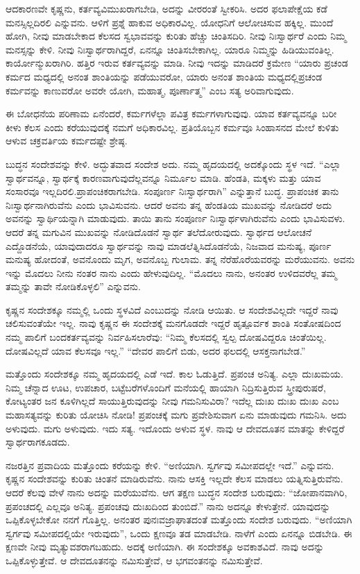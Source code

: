 ಆದಕಾರಣವೇ ಕೃಷ್ಣನು, ಕರ್ತವ್ಯವಿಮುಖರಾಗಬೇಡಿ, ಅದನ್ನು ವೀರರಂತೆ ಸ್ವೀಕರಿಸಿ. ಅದರ ಫಲಾಪೇಕ್ಷೆಯ ಕಡೆ ಮನಸ್ಸಿಲ್ಲದಿರಲಿ ಎನ್ನುವನು. ಆಳಿಗೆ ಪ್ರಶ್ನೆ ಹಾಕುವ ಅಧಿಕಾರವಿಲ್ಲ. ಯೋಧನಿಗೆ ಆಲೋಚಿಸುವ ಹಕ್ಕಿಲ್ಲ. ಮುಂದೆ ಹೋಗಿ, ನೀವು ಮಾಡಬೇಕಾದ ಕೆಲಸದ ಸ್ವಭಾವವನ್ನು ಕುರಿತು ಹೆಚ್ಚು ಚಿಂತಿಸದಿರಿ. ನೀವು ನಿಃಸ್ವಾರ್ಥರೆ ಎಂದು ನಿಮ್ಮ ಮನಸ್ಸನ್ನು ಕೇಳಿ. ನೀವು ನಿಃಸ್ವಾರ್ಥರಾಗಿದ್ದರೆ, ಏನನ್ನೂ ಚಿಂತಿಸಬೇಕಾಗಿಲ್ಲ. ಯಾರೂ ನಿಮ್ಮನ್ನು ಹಿಡಿಯುವಂತಿಲ್ಲ. ಕಾರ್ಯೋನ್ಮುಖರಾಗಿರಿ. ಹತ್ತಿರ ಇರುವ ಕರ್ತವ್ಯವನ್ನು ಮಾಡಿ. ನೀವು ಇದನ್ನು ಮಾಡಿದರೆ ಕ್ರಮೇಣ “ಯಾರು ಪ್ರಚಂಡ ಕರ್ಮದ ಮಧ್ಯದಲ್ಲಿ ಅನಂತ ಶಾಂತಿಯನ್ನು ಪಡೆಯುವರೋ, ಯಾರು ಅನಂತ ಶಾಂತಿಯ ಮಧ್ಯದಲ್ಲಿ\break ಪ್ರಚಂಡ ಕರ್ಮವನ್ನು ಕಾಣುವರೋ ಅವರೇ ಯೋಗಿ, ಮಹಾತ್ಮ, ಪೂರ್ಣಾತ್ಮ” ಎಂಬ ಸತ್ಯ ಅರಿವಾಗುವುದು.

ಈ ಬೋಧನೆಯ ಪರಿಣಾಮ ಏನೆಂದರೆ, ಕರ್ಮಗಳೆಲ್ಲಾ ಪವಿತ್ರ ಕರ್ಮಗಳಾಗುವುವು. ಯಾವ ಕರ್ತವ್ಯವನ್ನೂ ಬರೀ ಕೀಳು ಕೆಲಸ ಎಂದು ಕರೆಯುವುದಕ್ಕೆ ನಮಗೆ ಅಧಿಕಾರವಿಲ್ಲ. ಪ್ರತಿಯೊಬ್ಬನ ಕರ್ಮವೂ ಸಿಂಹಾಸನದ ಮೇಲೆ ಕುಳಿತು ಆಳುವ ಚಕ್ರವರ್ತಿಯ ಕರ್ಮದಷ್ಟೇ ಶ್ರೇಷ್ಠ.

ಬುದ್ಧನ ಸಂದೇಶವನ್ನು ಕೇಳಿ. ಅದ್ಭುತವಾದ ಸಂದೇಶ ಅದು. ನಮ್ಮ ಹೃದಯದಲ್ಲಿ ಅದಕ್ಕೊಂದು ಸ್ಥಳ ಇದೆ. “ಎಲ್ಲಾ ಸ್ವಾರ್ಥವನ್ನೂ, ಸ್ವಾರ್ಥಕ್ಕೆ ಕಾರಣವಾಗುವುದೆಲ್ಲವನ್ನೂ ನಿರ್ಮೂಲ ಮಾಡಿ. ಹೆಂಡತಿ, ಮಕ್ಕಳು ಮತ್ತು ಯಾವ ಸಂಸಾರವೂ ಇಲ್ಲದಿರಲಿ.\break ಪ್ರಾಪಂಚಿಕರಾಗಬೇಡಿ. ಸಂಪೂರ್ಣ ನಿಃಸ್ವಾರ್ಥರಾಗಿ” ಎನ್ನುತ್ತಾನೆ ಬುದ್ಧ. ಪ್ರಾಪಂಚಿಕ ತಾನು ನಿಃಸ್ವಾರ್ಥನಾಗಿರುವೆನು ಎಂದು ಭಾವಿಸುವನು. ಆದರೆ ಅವನು ತನ್ನ ಹೆಂಡತಿಯ ಮುಖವನ್ನು ನೋಡಿದರೆ ಅದು ಅವನನ್ನು ಸ್ವಾರ್ಥಿಯನ್ನಾಗಿ ಮಾಡುವುದು. ತಾಯಿ ತಾನು ಸಂಪೂರ್ಣ ನಿಃಸ್ವಾರ್ಥಳಾಗಿರುವೆನು ಎಂದು ಭಾವಿಸುವಳು. ಆದರೆ ತನ್ನ ಮಗುವಿನ ಮುಖವನ್ನು ನೋಡಿದೊಡನೆ ಸ್ವಾರ್ಥ ತಲೆದೋರುವುದು. ಸ್ವಾರ್ಥದ ಆಲೋಚನೆ ಎದ್ದೊಡನೆಯೆ, ಯಾವುದಾದರೂ ಸ್ವಾರ್ಥವನ್ನು ನಾವು ಮಾಡಲೆತ್ನಿಸಿದೊಡನೆಯೆ, ನಿಜವಾದ ಮನುಷ್ಯ, ಪೂರ್ಣ ಮನುಷ್ಯ ಹೋದಂತೆ, ಅವನೊಂದು ಮೃಗ, ಅವನೊಬ್ಬ ಗುಲಾಮ. ತನ್ನ ನೆರೆಹೊರೆಯವರನ್ನು ಮರೆಯುವನು. ಅವನು ಇನ್ನು ಮೊದಲು ನೀನು ನಂತರ ನಾನು ಎಂದು ಹೇಳುವುದಿಲ್ಲ. “ಮೊದಲು ನಾನು, ಅನಂತರ ಉಳಿದವರೆಲ್ಲ ತಮ್ಮ ತಮ್ಮನ್ನು ತಾವೇ ನೋಡಿಕೊಳ್ಳಲಿ” ಎನ್ನುವನು.

ಕೃಷ್ಣನ ಸಂದೇಶಕ್ಕೂ ನಮ್ಮಲ್ಲಿ ಒಂದು ಸ್ಥಳವಿದೆ ಎಂಬುದನ್ನು ನೋಡಿ ಆಯಿತು. ಆ ಸಂದೇಶವಿಲ್ಲದೇ ಇದ್ದರೆ ನಾವು ಚಲಿಸುವಂತೆಯೇ ಇಲ್ಲ. ನಾವು ಕೃಷ್ಣನ ಈ ಸಂದೇಶಕ್ಕೆ ಮನಗೊಡದೇ ಇದ್ದರೆ ಹೃತ್ಪೂರ್ವಕ ಶಾಂತಿ ಸಂತೋಷದಿಂದ ನಮ್ಮ ಪಾಲಿಗೆ ಬಂದ\break ಕರ್ತವ್ಯವನ್ನು ನಿರ್ವಹಿಸಲಾರೆವು: “ನಿಮ್ಮ ಕೆಲಸದಲ್ಲಿ ಸ್ವಲ್ಪ ದೋಷವಿದ್ದರೂ ಚಿಂತೆಯಿಲ್ಲ. ದೋಷವಿಲ್ಲದೆ ಯಾವ ಕೆಲಸವೂ ಇಲ್ಲ.” “ದೇವರ ಪಾಲಿಗೆ ಬಿಡು, ಅದರ ಫಲದಲ್ಲಿ ಆಸಕ್ತನಾಗಬೇಡ.”

ಮತ್ತೊಂದು ಸಂದೇಶಕ್ಕೂ ನಮ್ಮ ಹೃದಯದಲ್ಲಿ ಎಡೆ ಇದೆ. ಕಾಲ ಓಡುತ್ತಿದೆ. ಪ್ರಪಂಚ ಅನಿತ್ಯ. ಎಲ್ಲಾ ದುಃಖಮಯ. ನಿಮ್ಮ ಚೆನ್ನಾದ ಊಟ, ಉಪಚಾರ, ಬಟ್ಟೆಬರೆಗಳೊಂದಿಗೆ ಮನೆಯಲ್ಲಿ ಹಾಯಾಗಿ ನಿದ್ರಿಸುತ್ತಿರುವ ಸ್ತ್ರೀಪುರುಷರೆ, ಕೋಟ್ಯಂತರ ಜನ ಕೂಳಿಗಿಲ್ಲದೆ ಸಾಯುತ್ತಿರುವುದನ್ನು ನೀವು ಗಮನಿಸುವಿರಾ? ಇದೆಲ್ಲ ದುಃಖ ದುಃಖ ದುಃಖ ಎಂಬ ಮಹಾಸತ್ಯವನ್ನು ಕುರಿತು ಯೋಚಿಸಿ ನೋಡಿ! ಪ್ರಪಂಚಕ್ಕೆ ಮಗು ಪ್ರವೇಶಿಸುವಾಗ ಏನು ಮಾಡುವುದು ಗಮನಿಸಿ. ಅದು ಅಳುವುದು. ಮಗು ಅಳುವುದು. ಇದು ಸತ್ಯ. ಇದೊಂದು ಅಳುವ ಸ್ಥಳ. ನಾವು ಆ ದೇವದೂತನ ಮಾತನ್ನು ಕೇಳಿದ್ದರೆ ಸ್ವಾರ್ಥರಾಗಕೂಡದು.

ನಜರತ್ತಿನ ಪ್ರವಾದಿಯ ಮತ್ತೊಂದು ಕರೆಯನ್ನು ಕೇಳಿ. “ಅಣಿಯಾಗಿ. ಸ್ವರ್ಗವು ಸಮೀಪದಲ್ಲೇ ಇದೆ.” ಎನ್ನುವನು. ಕೃಷ್ಣನ ಸಂದೇಶವನ್ನು ಕುರಿತು ಚಿಂತನೆ ಮಾಡಿರುವೆನು. ನಾನು ಆಸಕ್ತಿ ಇಲ್ಲದೇ ಕೆಲಸ ಮಾಡಲು ಯತ್ನಿಸುತ್ತಿರುವೆನು. ಆದರೆ ಕೆಲವು ವೇಳೆ ನಾನು ಅದನ್ನು ಮರೆಯುವೆನು. ಆಗ ತಕ್ಷಣ ಬುದ್ಧನ ಸಂದೇಶ ಬರುವುದು: “ಜೋಪಾನವಾಗಿರಿ, ಪ್ರಪಂಚದಲ್ಲಿ ಎಲ್ಲವೂ ಅನಿತ್ಯ. ಪ್ರಪಂಚವು ದುಃಖದಿಂದ ತುಂಬಿದೆ.” ನಾನು ಅದನ್ನೂ ಕೇಳುತ್ತೇನೆ. ಯಾವುದನ್ನು ಒಪ್ಪಿಕೊಳ್ಳಬೇಕೋ ನನಗೆ ಗೊತ್ತಿಲ್ಲ. ಅನಂತರ ಪುನಃ\break ವಜ್ರಾಘಾತದಂತೆ ಮತ್ತೊಂದು ಸಂದೇಶ ಬರುವುದು. “ಅಣಿಯಾಗಿ ಸ್ವರ್ಗವು ಸಮೀಪದಲ್ಲಿಯೇ ಇರುವುದು”, ಒಂದು ಕ್ಷಣವೂ ತಡ ಮಾಡಬೇಡಿ. ನಾಳೆಗೆ ಎಂದು ಏನನ್ನೂ ಬಿಡಬೇಡಿ. ಈ ಕ್ಷಣವೇ ನೀವು ಮೃತ್ಯುವಶರಾಗಬಹುದು. ಅದಕ್ಕೆ ಅಣಿಯಾಗಿ. ಈ ಸಂದೇಶಕ್ಕೂ ಅವಕಾಶವಿದೆ. ನಾವು ಅದನ್ನು ಒಪ್ಪಿಕೊಳ್ಳುತ್ತೇವೆ. ಆ ದೇವದೂತನನ್ನು ನಮಿಸುತ್ತೇವೆ, ಆ ಭಗವಂತನನ್ನು ನಮಿಸುತ್ತೇವೆ.

